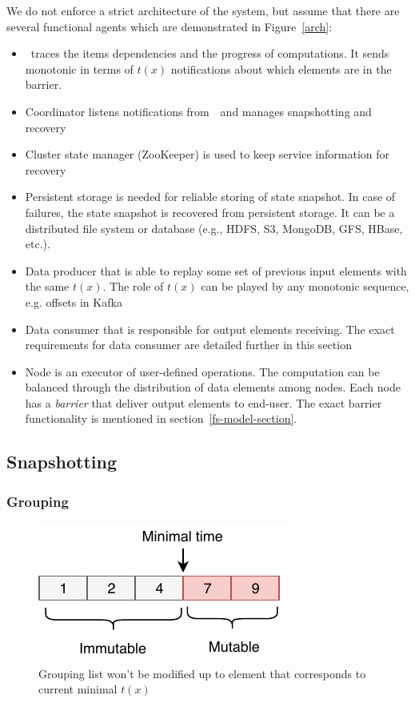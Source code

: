 We do not enforce a strict architecture of the system, but assume that there are several functional agents which are demonstrated in Figure~\ref{arch}:
\begin{itemize}
    \item \Acker\ traces the items dependencies and the progress of computations. It sends monotonic in terms of $t(x)$ notifications about which elements are in the barrier.
    \item Coordinator listens notifications from~\Acker\ and manages snapshotting and recovery
    \item Cluster state manager (ZooKeeper) is used to keep service information for recovery
    \item Persistent storage is needed for reliable storing of state snapshot. In case of failures, the state snapshot is recovered from persistent storage. It can be a distributed file system or database (e.g., HDFS, S3, MongoDB, GFS, HBase, etc.).
    \item Data producer that is able to replay some set of previous input elements with the same $t(x)$. The role of $t(x)$ can be played by any monotonic sequence, e.g. offsets in Kafka
    \item Data consumer that is responsible for output elements receiving. The exact requirements for data consumer are detailed further in this section
    \item Node is an executor of user-defined operations. The computation can be balanced through the distribution of data elements among nodes. Each node has a {\em barrier} that deliver output elements to end-user. The exact barrier functionality is mentioned in section~\ref{fs-model-section}.
\end{itemize}

\subsection{Snapshotting}

\subsubsection{Grouping}

\begin{figure}[tbp]
  \centering
  \includegraphics[width=0.5\columnwidth]{pics/immutable}
  \caption{Grouping list won't be modified up to element that corresponds to current minimal $t(x)$}    
  \label {immutable}    
\end{figure}

